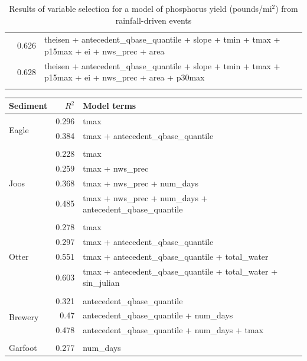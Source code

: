 \documentclass[10pt]{article}
\begin{document}
\begin{table}[h]
\begin{center}
\begin{tabular}{lrl}
 & 0.626 & theisen + antecedent\_qbase\_quantile + slope + tmin + tmax + p15max + ei + nws\_prec + area\\ 
 & 0.628 & theisen + antecedent\_qbase\_quantile + slope + tmin + tmax + p15max + ei + nws\_prec + area + p30max\\ 
\vspace{2mm}\\     \end{tabular}
    \caption{Results of variable selection for a model of phosphorus yield (pounds/$\text{mi}^2$) from rainfall-driven events\label{phos_r_square_nosnow}}
    \end{center}
\end{table}


\begin{table}[h] \small
    \begin{center}
    \begin{tabular}{lrl}
    \textbf{Sediment} & $R^2$ & Model terms \\
    \hline
\multirow{3}{*}{Eagle} & 0.296 & tmax\\ 
 & 0.384 & tmax + antecedent\_qbase\_quantile\\ 
\vspace{2mm}\\ \multirow{5}{*}{Joos} & 0.228 & tmax\\ 
 & 0.259 & tmax + nws\_prec\\ 
 & 0.368 & tmax + nws\_prec + num\_days\\ 
 & 0.485 & tmax + nws\_prec + num\_days + antecedent\_qbase\_quantile\\ 
\vspace{2mm}\\ \multirow{5}{*}{Otter} & 0.278 & tmax\\ 
 & 0.297 & tmax + antecedent\_qbase\_quantile\\ 
 & 0.551 & tmax + antecedent\_qbase\_quantile + total\_water\\ 
 & 0.603 & tmax + antecedent\_qbase\_quantile + total\_water + sin\_julian\\ 
\vspace{2mm}\\ \multirow{4}{*}{Brewery} & 0.321 & antecedent\_qbase\_quantile\\ 
 & 0.47 & antecedent\_qbase\_quantile + num\_days\\ 
 & 0.478 & antecedent\_qbase\_quantile + num\_days + tmax\\ 
\vspace{2mm}\\ \multirow{6}{*}{Garfoot} & 0.277 & num\_days\\ 

\end{tabular}
\end{center}
\end{table}
\end{document}
